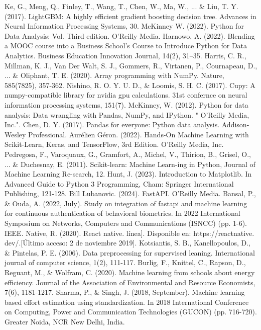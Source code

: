 \documentclass[12pt,a4paper]{article}
\begin{document}
\begin{enumerate}
\begin{thebibliography}{99}
 Ke, G., Meng, Q., Finley, T., Wang, T., Chen, W., Ma, W., ... \& Liu, T. Y. (2017). LightGBM: A highly efficient gradient boosting decision tree. Advances in Neural Information Processing Systems, 30.
 McKinney W. (2022). Python for Data Analysis: Vol. Third edition. O’Reilly Media.
 Harnowo, A. (2022). Blending a MOOC course into a Business School’s Course to Introduce Python for Data Analytics. Business Education Innovation Journal, 14(2), 31–35.
 Harris, C. R., Millman, K. J., Van Der Walt, S. J., Gommers, R., Virtanen, P., Cournapeau, D., ... \& Oliphant, T. E. (2020). Array programming with NumPy. Nature, 585(7825), 357-362.
 Nishino, R. O. Y. U. D., \& Loomis, S. H. C. (2017). Cupy: A numpy-compatible library for nvidia gpu calculations. 31st confernce on neural information processing systems, 151(7).
 McKinney, W. (2012). Python for data analysis: Data wrangling with Pandas, NumPy, and IPython. " O'Reilly Media, Inc.".
 Chen, D. Y. (2017). Pandas for everyone: Python data analysis. Addison-Wesley Professional.
 Aurélien Géron. (2022). Hands-On Machine Learning with Scikit-Learn, Keras, and TensorFlow, 3rd Edition. O’Reilly Media, Inc.
 Pedregosa, F., Varoquaux, G., Gramfort, A., Michel, V., Thirion, B., Grisel, O., ... \& Duchesnay, E. (2011). Scikit-learn: Machine Learn-ing in Python, Journal of Machine Learning Re-search, 12.
 Hunt, J. (2023). Introduction to Matplotlib. In Advanced Guide to Python 3 Programming, Cham: Springer International Publishing, 121-128.
 Bill Lubanovic. (2024). FastAPI. O’Reilly Media.
 Bansal, P., \& Ouda, A. (2022, July). Study on integration of fastapi and machine learning for continuous authentication of behavioral biometrics. In 2022 International Symposium on Networks, Computers and Communications (ISNCC) (pp. 1-6). IEEE.
 Native, R. (2020). React native. línea]. Disponible en: https://reactnative. dev/.[Último acceso: 2 de noviembre 2019].
 Kotsiantis, S. B., Kanellopoulos, D., \& Pintelas, P. E. (2006). Data preprocessing for supervised leaning. International journal of computer science, 1(2), 111-117.
 Burlig, F., Knittel, C., Rapson, D., Reguant, M., \& Wolfram, C. (2020). Machine learning from schools about energy efficiency. Journal of the Association of Environmental and Resource Economists, 7(6), 1181-1217.
 Sharma, P., \& Singh, J. (2018, September). Machine learning based effort estimation using standardization. In 2018 International Conference on Computing, Power and Communication Technologies (GUCON) (pp. 716-720).  Greater Noida, NCR New Delhi, India.

\end{thebibliography}
\end{enumerate}
\end{document}
